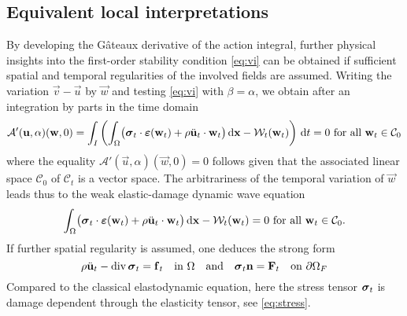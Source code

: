 \subsection{Equivalent local interpretations} \label{sec:equivalentlocal}
By developing the Gâteaux derivative of the action integral, further physical insights into the first-order stability condition \eqref{eq:vi} can be obtained if sufficient spatial and temporal regularities of the involved fields are assumed. Writing the variation $\vec{v}-\vec{u}$ by $\vec{w}$ and testing \eqref{eq:vi} with $\beta=\alpha$, we obtain after an integration by parts in the time domain
\begin{equation} \label{eq:actionu}
\mathcal{A}'(\vec{u},\alpha)(\vec{w},0)=\int_I\left(\int_\Omega\bigl(\sig_t\cdot\eps(\vec{w}_t)+\rho\ddot{\vec{u}}_t\cdot\vec{w}_t\bigr)\dx-\mathcal{W}_t(\vec{w}_t)\right)\D{t}=0\text{ for all $\vec{w}_t\in\mathcal{C}_0$}
\end{equation}
where the equality $\mathcal{A}'(\vec{u},\alpha)(\vec{w},0)=0$ follows given that the associated linear space $\mathcal{C}_0$ of $\mathcal{C}_t$ is a vector space. The arbitrariness of the temporal variation of $\vec{w}$ leads thus to the weak elastic-damage dynamic wave equation
\begin{equation} \label{eq:weakform}
\int_\Omega\bigl(\sig_t\cdot\eps(\vec{w}_t)+\rho\ddot{\vec{u}}_t\cdot\vec{w}_t\bigr)\dx-\mathcal{W}_t(\vec{w}_t)=0\text{ for all $\vec{w}_t\in\mathcal{C}_0$}.
\end{equation}
If further spatial regularity is assumed, one deduces the strong form
\begin{equation} \label{eq:wavedyn}
\rho\ddot{\vec{u}}_t-\div\sig_t=\vec{f}_t\quad\text{in }\Omega\quad\text{and}\quad\sig_t\vec{n}=\vec{F}_t\quad\text{on }\partial\Omega_F
\end{equation}
Compared to the classical elastodynamic equation, here the stress tensor $\sig_t$ is damage dependent through the elasticity tensor, see \eqref{eq:stress}.

